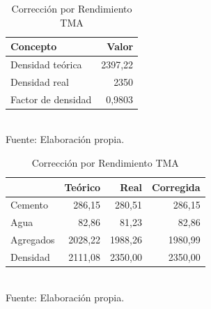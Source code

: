 \begin{table}[H]
\centering
\caption{Rendimiento de mezcla y factor de densidad}
\label{tab:rend-y-factor}
\small
\setlength{\tabcolsep}{6pt}
\renewcommand{\arraystretch}{1.15}

\begin{subtable}[t]{0.38\textwidth}
\centering
\caption{Densidades}
\label{tab:factor-rendimiento}
\begin{tabular}{lr}
\toprule
\textbf{Concepto} & \textbf{Valor} \\
\midrule
Densidad teórica & 2397,22 \\
Densidad real    & 2350 \\
Factor de densidad          & 0,9803 \\
\bottomrule
\end{tabular}
\\Fuente: Elaboración propia.
\end{subtable}
\begin{subtable}[t]{0.58\textwidth}
\centering
\caption{Corrección por Rendimiento TMA}
\label{tab:rendimiento}
\begin{tabular}{lrrr}
\toprule
 & \textbf{Teórico} & \textbf{Real} & \textbf{Corregida} \\
\midrule
Cemento   & 286,15 & 280,51 & 286,15 \\
Agua      & 82,86  & 81,23  & 82,86  \\
Agregados & 2028,22 & 1988,26 & 1980,99 \\
Densidad  & 2111,08 & 2350,00 & 2350,00 \\
\bottomrule
\end{tabular}
\\Fuente: Elaboración propia.
\end{subtable}


\end{table}


